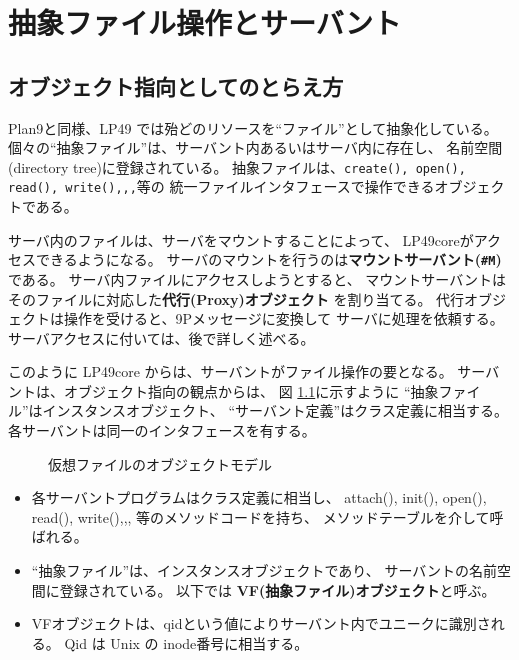 {%
\chapter{抽象ファイル操作とサーバント}

\section{オブジェクト指向としてのとらえ方}

Plan9と同様、LP49 では殆どのリソースを``ファイル''として抽象化している。
個々の``抽象ファイル''は、サーバント内あるいはサーバ内に存在し、
名前空間(directory tree)に登録されている。
抽象ファイルは、{\tt create(), open(), read(), write(),,,}等の
統一ファイルインタフェースで操作できるオブジェクトである。

サーバ内のファイルは、サーバをマウントすることによって、
LP49coreがアクセスできるようになる。
サーバのマウントを行うのは{\bf マウントサーバント(\verb|#M|)}である。
サーバ内ファイルにアクセスしようとすると、
マウントサーバントはそのファイルに対応した{\bf 代行(Proxy)オブジェクト}
を割り当てる。
代行オブジェクトは操作を受けると、9Pメッセージに変換して
サーバに処理を依頼する。
サーバアクセスに付いては、後で詳しく述べる。

このように LP49core からは、サーバントがファイル操作の要となる。
サーバントは、オブジェクト指向の観点からは、
図 \ref{fig:VirtualFileObject}に示すように
``抽象ファイル''はインスタンスオブジェクト、
``サーバント定義''はクラス定義に相当する。
各サーバントは同一のインタフェースを有する。

\begin{figure}[htb]
  \begin{center}
   \epsfxsize=340pt
    \caption{仮想ファイルのオブジェクトモデル}
    \label{fig:VirtualFileObject}
  \end{center}
\end{figure}


\begin{itemize}
\item  各サーバントプログラムはクラス定義に相当し、
  attach(), init(), open(), read(), write(),,, 等のメソッドコードを持ち、
  メソッドテーブルを介して呼ばれる。
\item  ``抽象ファイル''は、インスタンスオブジェクトであり、
   サーバントの名前空間に登録されている。
   以下では {\bf VF(抽象ファイル)オブジェクト}と呼ぶ。

\item  VFオブジェクトは、qidという値によりサーバント内でユニークに識別される。
       Qid は Unix の inode番号に相当する。


\end{itemize}}
